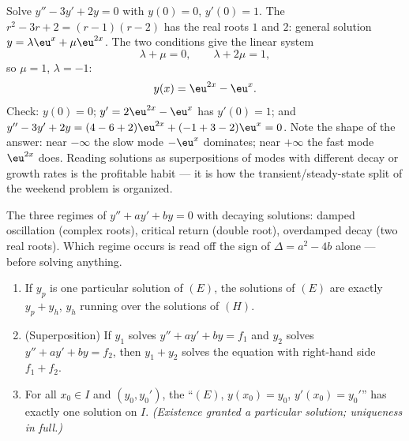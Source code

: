 \begin{example}\label{ex:b1:diffeq:cauchy2}
Solve $y'' - 3y' + 2y = 0$ with $y(0) = 0$, $y'(0) = 1$. The
 $r^2 - 3r + 2 = (r - 1)(r - 2)$ has the
real roots $1$ and $2$: general solution $y = \lambda\eu^{x} +
\mu\eu^{2x}$. The two conditions give the linear system
\[
\lambda + \mu = 0, \qquad \lambda + 2\mu = 1 ,
\]
so $\mu = 1$, $\lambda = -1$:
\[
y(x) = \eu^{2x} - \eu^{x} .
\]
Check: $y(0) = 0$; $y' = 2\eu^{2x} - \eu^x$ has $y'(0) = 1$; and
$y'' - 3y' + 2y = (4 - 6 + 2)\eu^{2x} + (-1 + 3 - 2)\eu^x = 0$.
Note the shape of the answer: near $-\infty$ the slow mode
$-\eu^x$ dominates; near $+\infty$ the fast mode $\eu^{2x}$ does.
Reading solutions as superpositions of modes with different decay
or growth rates is the profitable habit --- it is how the
transient/steady-state split of the weekend problem is organized.
\end{example}

\begin{omfigure}

{\small The three regimes of $y'' + ay' + by = 0$ with decaying
solutions: damped oscillation (complex roots), critical return
(double root), overdamped decay (two real roots). Which regime
occurs is read off the sign of $\Delta = a^2 - 4b$ alone ---
before solving anything.}
\end{omfigure}

\begin{theorem}\label{thm:b1:diffeq:structure2}
\begin{enumerate}
  \item If $y_p$ is one particular solution of $(E)$, the solutions of
        $(E)$ are exactly $y_p + y_h$, $y_h$ running over the
        solutions of $(H)$.
  \item (Superposition) If $y_1$ solves $y'' + ay' + by = f_1$ and
        $y_2$ solves $y'' + ay' + by = f_2$, then $y_1 + y_2$ solves
        the equation with right-hand side $f_1 + f_2$.
  \item For all $x_0 \in I$ and $(y_0, y_0')$, the 
        ``$(E)$, $y(x_0) = y_0$, $y'(x_0) = y_0'$'' has exactly one
        solution on $I$. \emph{(Existence granted a particular
        solution; uniqueness in full.)}
\end{enumerate}
\end{theorem}


